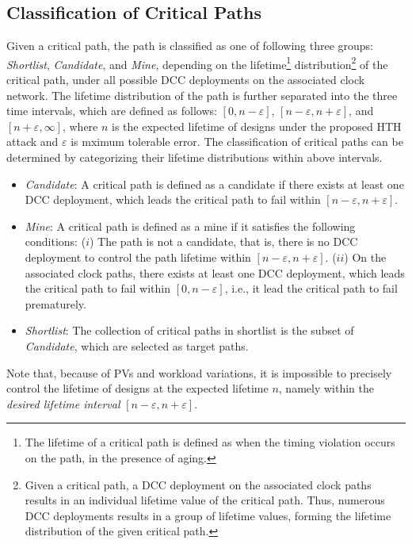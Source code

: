 \subsection{Classification of Critical Paths}
\label{sec:frame:cp}
Given a critical path, the path is classified as one of following three groups: \textit{Shortlist}, \textit{Candidate}, and \textit{Mine}, depending on the lifetime\footnote{The lifetime of a critical path is defined as when the timing violation occurs on the path, in the presence of aging.} distribution\footnote{Given a critical path, a DCC deployment on the associated clock paths results in an individual lifetime value of the critical path. Thus, numerous DCC deployments results in a group of lifetime values, forming the lifetime distribution of the given critical path.} of the critical path, under all possible DCC deployments on the associated clock network. The lifetime distribution of the path is further separated into the three time intervals, which are defined as follows: $[0, n - \varepsilon]$, $[n - \varepsilon, n + \varepsilon]$, and $[n + \varepsilon, \infty]$, where $n$ is the expected lifetime of designs under the proposed HTH attack and $\varepsilon$ is mximum tolerable error. The classification of critical paths can be determined by categorizing their lifetime distributions within above intervals. 
\begin{itemize}
	\item \textit{Candidate}: A critical path is defined as a candidate if there exists at least one DCC deployment, which leads the critical path to fail within $[n - \varepsilon, n + \varepsilon]$.
	\item \textit{Mine}: A critical path is defined as a mine if it satisfies the following conditions: ($i$) The path is not a candidate, that is, there is no DCC deployment to control the path lifetime within $[n - \varepsilon, n + \varepsilon]$. ($ii$) On the associated clock paths, there exists at least one DCC deployment, which leads the critical path to fail within $[0, n - \varepsilon]$, i.e., it lead the critical path to fail prematurely.
	\item \textit{Shortlist}:  The collection of critical paths in shortlist is the subset of \textit{Candidate}, which are selected as target paths.
\end{itemize}

Note that, because of PVs and workload variations, it is impossible to precisely control the lifetime of designs at the expected lifetime $n$, namely within the \textit{desired lifetime interval}  $[n - \varepsilon, n + \varepsilon]$.

